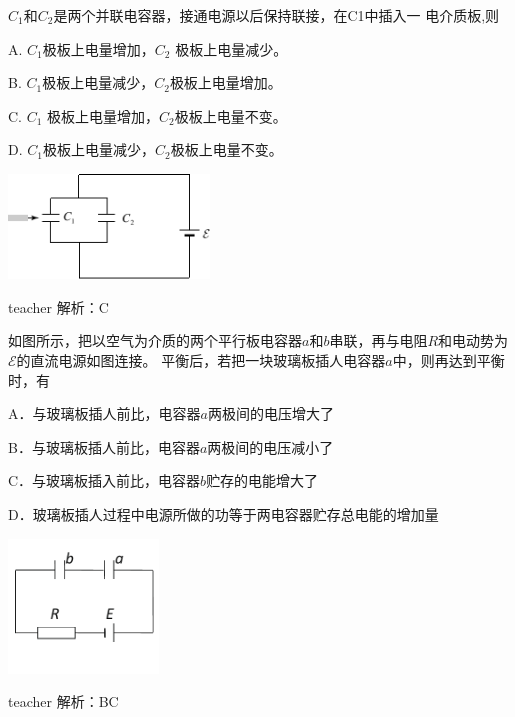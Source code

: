 \begin{example}
$C_1$和$C_2$是两个并联电容器，接通电源以后保持联接，在C1中插入一
电介质板,则\kong\kong


A. $C_1$极板上电量增加，$C_2$ 极板上电量减少。

B.  $C_1$极板上电量减少，$C_2$极板上电量增加。

C.  $C_1$ 极板上电量增加，$C_2$极板上电量不变。 

D.  $C_1$极板上电量减少，$C_2$极板上电量不变。
\begin{flushright}
\includegraphics[width=0.4\textwidth]{images/elec-problem-23.pdf}
\end{flushright}

\begin{taggedblock}{teacher}
\noindent
解析：C
\end{taggedblock}
\end{example}


\begin{example}
如图所示，把以空气为介质的两个平行板电容器$a$和$b$串联，再与电阻$R$和电动势为$\mathcal{E}$的直流电源如图连接。
平衡后，若把一块玻璃板插人电容器$a$中，则再达到平衡时，有\kong\kong

A．与玻璃板插人前比，电容器$a$两极间的电压增大了

B．与玻璃板插人前比，电容器$a$两极间的电压减小了

C．与玻璃板插入前比，电容器$b$贮存的电能增大了

D．玻璃板插人过程中电源所做的功等于两电容器贮存总电能的增加量
\begin{flushright}
\includegraphics[width = 0.3\textwidth]{images/alt-current-6.pdf} 
\end{flushright}


\begin{taggedblock}{teacher}
\noindent
解析：BC
\end{taggedblock}
\end{example}

